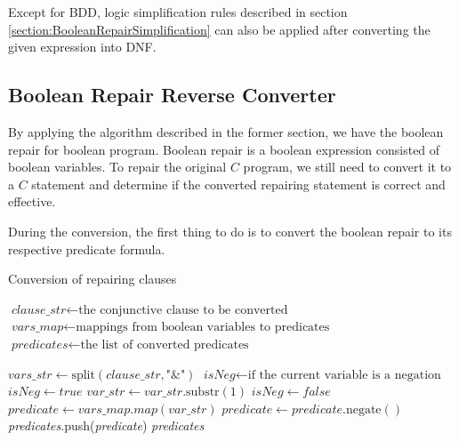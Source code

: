 Except for BDD, logic simplification rules described in section \ref{section:BooleanRepairSimplification} can also be applied after converting the given expression into DNF.

\subsection{Boolean Repair Reverse Converter}
By applying the algorithm described in the former section, we have the boolean repair for boolean program.
Boolean repair is a boolean expression consisted of boolean variables.
To repair the original $C$ program, we still need to convert it to a $C$ statement and determine if the converted repairing statement is correct and effective.


During the conversion, the first thing to do is to convert the boolean repair to its respective predicate formula.

\begin{algorithm}
\caption{Conversion of repairing clauses}
\begin{algorithmic}[1]

\STATE $\textit{clause\_str} \gets \text{the conjunctive clause to be converted}$
\STATE $\textit{vars\_map} \gets \text{mappings from boolean variables to predicates}$
\STATE $\textit{predicates} \gets \text{the list of converted predicates}$
\STATE

\STATE $\textit{vars\_str} \gets \text{split}(\textit{clause\_str}, \text{"\&"})$
  \STATE $\textit{isNeg} \gets \text{if the current variable is a negation}$
    \STATE $\textit{isNeg} \gets true$
    \STATE $\textit{var\_str} \gets \textit{var\_str}.\text{substr}(1)$
  \ELSE
    \STATE $\textit{isNeg} \gets false$
  \ENDIF
  \STATE
  \STATE $\textit{predicate} \gets \textit{vars\_map}.map(\textit{var\_str})$
    \STATE $\textit{predicate} \gets \textit{predicate}.\text{negate}()$
  \ENDIF
  \STATE \textit{predicates}.push(\textit{predicate})
\ENDFOR
\STATE
\RETURN \textit{predicates}

\end{algorithmic}
\end{algorithm}

